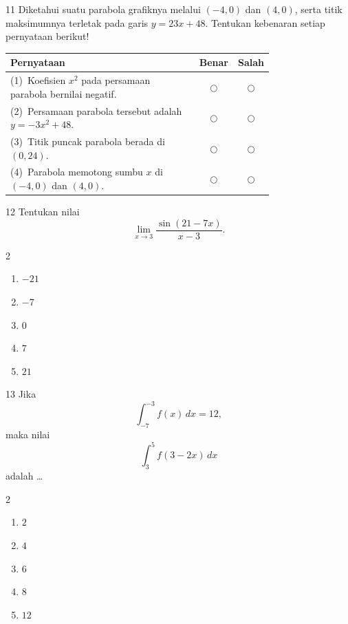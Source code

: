 \documentclass[11pt]{article}
\newenvironment{pilB}{%
  \par\smallskip\begin{multicols}{2}
  \begin{enumerate}[label=(\Alph*),leftmargin=*,itemsep=1pt,topsep=3pt]}%
  {\end{enumerate}\end{multicols}}
\begin{document}
\begin{soal}{11}
Diketahui suatu parabola grafiknya melalui $(-4,0)$ dan $(4,0)$,
serta titik maksimumnya terletak pada garis $y=23x+48$.
Tentukan kebenaran setiap pernyataan berikut!

\par\smallskip
{\renewcommand{\arraystretch}{1.4}%
\begin{tabular}{@{}p{0.76\linewidth}cc@{}}
\hline
\textbf{Pernyataan} & \textbf{Benar} & \textbf{Salah}\\
\hline
(1)~Koefisien $x^2$ pada persamaan parabola bernilai negatif.
  & $\bigcirc$ & $\bigcirc$\\
(2)~Persamaan parabola tersebut adalah $y=-3x^2+48$.
  & $\bigcirc$ & $\bigcirc$\\
(3)~Titik puncak parabola berada di $(0,24)$.
  & $\bigcirc$ & $\bigcirc$\\
(4)~Parabola memotong sumbu $x$ di $(-4,0)$ dan $(4,0)$.
  & $\bigcirc$ & $\bigcirc$\\
\hline
\end{tabular}}
\end{soal}

\begin{soal}{12}
Tentukan nilai
\[
  \lim_{x\to 3}\frac{\sin(21-7x)}{x-3}.
\]
\begin{pilB}
  \item $-21$ \item $-7$ \item $0$ \item $7$ \item $21$
\end{pilB}
\end{soal}

\begin{soal}{13}
Jika
\[
  \int_{-7}^{-3}f(x)\,dx=12,
\]
maka nilai
\[
  \int_{3}^{5}f(3-2x)\,dx
\]
adalah \ldots
\begin{pilB}
  \item $2$ \item $4$ \item $6$ \item $8$ \item $12$
\end{pilB}
\end{soal}
\end{document}
